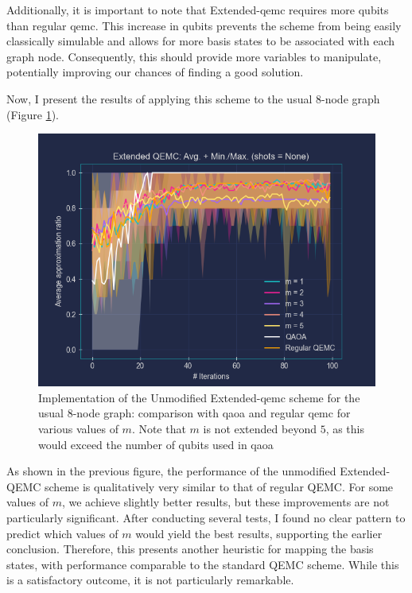 Additionally, it is important to note that Extended-\acrshort{qemc} requires more qubits than regular \acrshort{qemc}. This increase in qubits prevents the scheme from being easily classically simulable and allows for more basis states to be associated with each graph node. Consequently, this should provide more variables to manipulate, potentially improving our chances of finding a good solution.

Now, I present the results of applying this scheme to the usual $8$-node graph (Figure \ref{fig:Vanilla_Extended-QEMC}).
\begin{figure}[h]
    \centering
    \includegraphics[width=1\textwidth]{Figures/Chapter_5/Extended-QEMC/8-node(n_layers=3, step_size=0.95, m=All).png}
    \caption{Implementation of the Unmodified Extended-\acrshort{qemc} scheme for the usual $8$-node graph: comparison with \acrshort{qaoa} and regular \acrshort{qemc} for various values of $m$. Note that $m$ is not extended beyond $5$, as this would exceed the number of qubits used in \acrshort{qaoa}}
    \label{fig:Vanilla_Extended-QEMC}
\end{figure}

As shown in the previous figure, the performance of the unmodified Extended-QEMC scheme is qualitatively very similar to that of regular QEMC. For some values of $m$, we achieve slightly better results, but these improvements are not particularly significant. After conducting several tests, I found no clear pattern to predict which values of $m$ would yield the best results, supporting the earlier conclusion. Therefore, this presents another heuristic for mapping the basis states, with performance comparable to the standard QEMC scheme. While this is a satisfactory outcome, it is not particularly remarkable.

